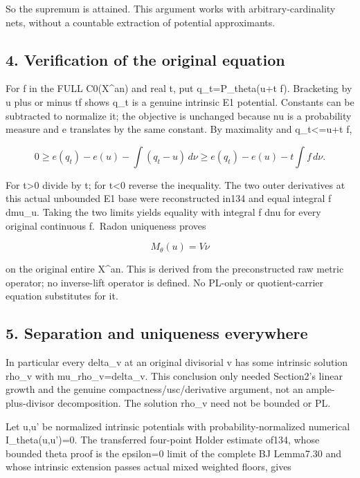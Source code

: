 \documentclass[
  10pt,
]{article}
\begin{document}
So the supremum is attained. This argument works with
arbitrary-cardinality nets, without a countable extraction of potential
approximants.

\subsection{4. Verification of the original
equation}\label{verification-of-the-original-equation}

For f in the FULL C0(X\^{}an) and real t, put q\_t=P\_theta(u+t f).
Bracketing by u plus or minus
\textbar t\textbar\textbar\textbar f\textbar\textbar{} shows q\_t is a
genuine intrinsic E1 potential. Constants can be subtracted to normalize
it; the objective is unchanged because nu is a probability measure and e
translates by the same constant. By maximality and q\_t\textless=u+t f,

\[0\geq e(q_t)-e(u)-\int(q_t-u)\,d\nu
\geq e(q_t)-e(u)-t\int f\,d\nu.\]

For t\textgreater0 divide by t; for t\textless0 reverse the inequality.
The two outer derivatives at this actual unbounded E1 base were
reconstructed in134 and equal integral f dmu\_u. Taking the two limits
yields equality with integral f dnu for every original continuous
f.~Radon uniqueness proves

\[M_\theta(u)=V\nu\]

on the original entire X\^{}an. This is derived from the preconstructed
raw metric operator; no inverse-lift operator is defined. No PL-only or
quotient-carrier equation substitutes for it.

\subsection{5. Separation and uniqueness
everywhere}\label{separation-and-uniqueness-everywhere}

In particular every delta\_v at an original divisorial v has some
intrinsic solution rho\_v with mu\_rho\_v=delta\_v. This conclusion only
needed Section2's linear growth and the genuine
compactness/usc/derivative argument, not an ample-plus-divisor
decomposition. The solution rho\_v need not be bounded or PL.

Let u,u' be normalized intrinsic potentials with probability-normalized
numerical I\_theta(u,u')=0. The transferred four-point Holder estimate
of134, whose bounded theta proof is the epsilon=0 limit of the complete
BJ Lemma7.30 and whose intrinsic extension passes actual mixed weighted
floors, gives
\end{document}
